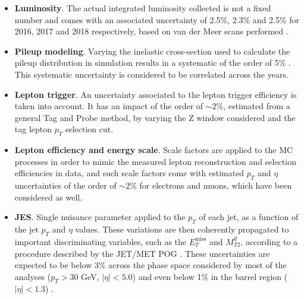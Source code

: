 \documentclass[a4paper, 10pt, openright]{report}
\begin{document}
\begin{itemize}
\item \textbf{Luminosity}. The actual integrated luminosity collected is not a fixed number and comes with an associated uncertainty of 2.5\%, 2.3\% and 2.5\% for 2016, 2017 and 2018 respectively, based on van der Meer scans performed \cite{Lumi2016, Lumi2017, Lumi2018}.
\item \textbf{Pileup modeling}. Varying the inelastic cross-section used to calculate the pileup distribution in simulation results in a systematic of the order of 5\% \cite{PUmodel}. This systematic uncertainty is considered to be correlated across the years.
\item \textbf{Lepton trigger}. An uncertainty associated to the lepton trigger efficiency is taken into account. It has an impact of the order of $\sim 2$\%, estimated from a general Tag and Probe method, by varying the Z window considered and the tag lepton $p_T$ selection cut. 
\item \textbf{Lepton efficiency and energy scale}. Scale factors are applied to the \ac{MC} processes in order to mimic the measured lepton reconstruction and selection efficiencies in data, and such scale factors come with estimated $p_T$ and $\eta$ uncertainties of the order of $\sim2$\% for electrons and muons, which have been considered as well.  
\item \textbf{\ac{JES}}. Single nuisance parameter applied to the $p_T$ of each jet, as a function of the jet $p_T$ and $\eta$ values. These variations are then coherently propagated to important discriminating variables, such as the $E_T^\text{miss}$ and $M_{T2}^{ll}$, according to a procedure described by the JET/MET \ac{POG} \cite{JETMETPOG}. These uncertainties are expected to be below 3\% across the phase space considered by most of the analyses ($p_T > 30$ GeV, $|\eta| < 5.0$) and even below 1\% in the barrel region ($|\eta| < 1.3$) \cite{JESUncertainty}.

\end{itemize}
\end{document}
